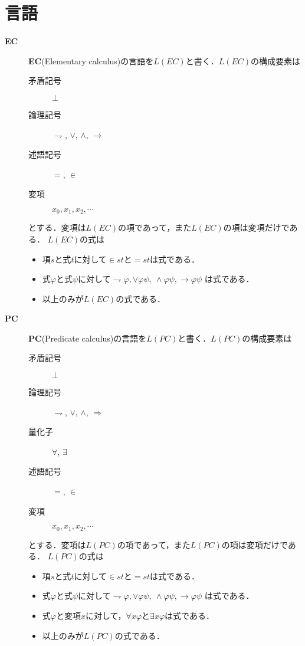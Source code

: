 \section{言語}
	\begin{description}
	\item[{\bf EC}]
	{\bf EC}(Elementary calculus)の言語を$L(EC)$と書く．$L(EC)$の構成要素は
	\begin{description}
		\item[矛盾記号] $\bot$
		\item[論理記号] $\rightharpoondown$, $\vee$, $\wedge$, $\rightarrow$
		\item[述語記号] $=$, $\in$
		\item[変項] $x_{0},x_{1},x_{2},\cdots$
	\end{description}
	とする．変項は$L(EC)$の項であって，また$L(EC)$の項は変項だけである．
	$L(EC)$の式は
	\begin{itemize}
		\item 項$s$と式$t$に対して$\in st$と$= st$は式である．
		\item 式$\varphi$と式$\psi$に対して$\rightharpoondown \varphi,
			\vee \varphi \psi,\ \wedge \varphi \psi, \rightarrow \varphi \psi$
			は式である．
		\item 以上のみが$L(EC)$の式である．
	\end{itemize}
	
	\item[{\bf PC}]
	{\bf PC}(Predicate calculus)の言語を$L(PC)$と書く．$L(PC)$の構成要素は
	\begin{description}
		\item[矛盾記号] $\bot$
		\item[論理記号] $\rightharpoondown$, $\vee$, $\wedge$, $\Longrightarrow$
		\item[量化子] $\forall$, $\exists$
		\item[述語記号] $=$, $\in$
		\item[変項] $x_{0},x_{1},x_{2},\cdots$
	\end{description}
	とする．変項は$L(PC)$の項であって，また$L(PC)$の項は変項だけである．
	$L(PC)$の式は
	\begin{itemize}
		\item 項$s$と式$t$に対して$\in st$と$= st$は式である．
		\item 式$\varphi$と式$\psi$に対して$\rightharpoondown \varphi,
			\vee \varphi \psi,\ \wedge \varphi \psi, \rightarrow \varphi \psi$
			は式である．
		\item 式$\varphi$と変項$x$に対して，$\forall x \varphi$と$\exists x \varphi$は式である．
		\item 以上のみが$L(PC)$の式である．
	\end{itemize}
	\end{description}
	

